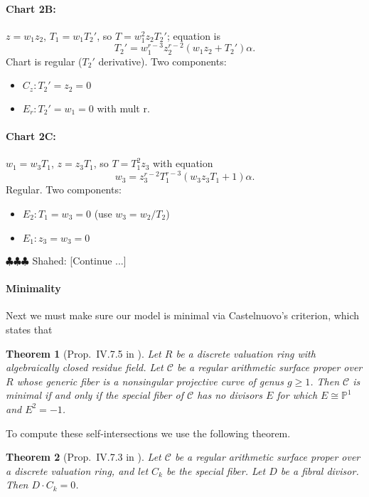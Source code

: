 \documentclass{article}
\newcommand{\shahed}[1]{{\color{Purple} \sf $\clubsuit\clubsuit\clubsuit$ Shahed: [#1]}}
\newcommand{\scd}{\mathscr{C}}
\theoremstyle{plain}
\newtheorem{theorem}{Theorem}[section]
\theoremstyle{definition}
\theoremstyle{remark}
\newcommand{\isom}{\cong}
\newcommand{\Pro}{\ensuremath{\mathbb{P}}}
\begin{document}
\paragraph{Chart 2B:}
\label{sec:chart-b}

$z = w_1 z_2$, $T_1 = w_1 T_2'$, so $T = w_1^2 z_2 T_2'$; equation is
\[
T_2' = w_1^{r-3} z_2^{r-2} (w_1z_2 + T_2') \alpha.
\]
Chart is regular ($T_2'$ derivative). Two components:
\begin{itemize}
    \item $C_z: T_2' = z_2 = 0$
    \item $E_r: T_2' = w_1 = 0$ with mult r.
\end{itemize}

\paragraph{Chart 2C:}
\label{sec:chart-c}

$w_1 = w_3 T_1$, $z = z_3 T_1$, so $T = T_1^2 z_3$ with equation
\[
w_3 = z_3^{r-2} T_1^{r-3} (w_3 z_3 T_1 + 1) \alpha.
\]
Regular. Two components:
\begin{itemize}
    \item $E_2: T_1 = w_3 = 0$ (use $w_3 = w_2/T_2$)
    \item $E_1: z_3 = w_3 = 0$
\end{itemize}

\shahed{Continue ...}






\paragraph{Minimality}
\label{sec:minimality}

Next we must make sure our model is minimal via Castelnuovo's criterion, which states that
\begin{theorem}[Prop.~IV.7.5 in \cite{silvermanATAEC}]\label{thm:castelnuovo}
  Let $R$ be a discrete valuation ring with algebraically closed residue field. Let $\scd$ be a regular arithmetic surface proper over $R$ whose generic fiber is a nonsingular projective curve of genus $g \geq 1$. Then $\scd$ is minimal if and only if the special fiber of $\scd$ has no divisors $E$ for which $E \isom \Pro^1$ and $E^2 = -1$.
\end{theorem}

To compute these self-intersections we use the following theorem.
\begin{theorem}[Prop.~IV.7.3 in \cite{silvermanATAEC}]\label{thm:fibral-intersect-total}
  Let $\scd$ be a regular arithmetic surface proper over a discrete valuation ring, and let $C_k$ be the special fiber. Let $D$ be a fibral divisor. Then $D \cdot C_k = 0$.
\end{theorem}
\end{document}
